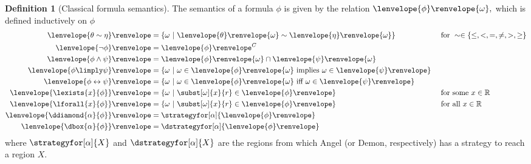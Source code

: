 \documentclass[12pt]{cmuthesis}
\theoremstyle{definition}
\newtheorem{definition}{Definition}
\theoremstyle{remark}
\newcommand{\lequiv}{\leftrightarrow}
\newcommand{\om}{\omega}
\newcommand{\tint}[2]{\lenvelope{#1}\renvelope{#2}}
\newcommand{\fint}[1]{\lenvelope{#1}\renvelope}
\begin{document}
\begin{definition}[Classical formula semantics]\label{def:dgl-sem-fml}
The semantics of a formula $\phi$ is given by the relation $\fint{\phi}{\om},$ which is defined inductively on $\phi$
\begin{align*}
\fint{\theta \sim \eta}  &= \{\om~|~\tint{\theta}{\om} \sim \tint{\eta}{\om}\} && \text{ for }\sim \in \{\leq,<,=,\neq,>,\geq\}\\
\fint{\neg \phi}         &= \fint{\phi}^C && \\
\fint{\phi \land \psi}   &= \fint{\phi}{\om} \cap \fint{\psi}{\om}\\
\fint{\phi \limply \psi} &= \{\om~|~ \om \in \fint{\phi}{\om} \text{ implies } \om \in \fint{\psi}\}\\
\fint{\phi \lequiv \psi} &= \{\om~|~ \om \in \fint{\phi}{\om} \text{ iff } \om \in \fint{\psi}\}\\
\fint{\lexists{x}{\phi}} &= \{\om~|~ \subst[\om]{x}{r} \in \fint{\phi}\} && \text{ for some }x \in \mathbb{R}\\
\fint{\lforall{x}{\phi}} &= \{\om~|~ \subst[\om]{x}{r} \in \fint{\phi}\} && \text{ for all }x \in \mathbb{R}\\
\fint{\ddiamond{\alpha}{\phi}} &=  \strategyfor[\alpha]{\fint{\phi}}\\
\fint{\dbox{\alpha}{\phi}} &= \dstrategyfor[\alpha]{\fint{\phi}}
\end{align*}
where $\strategyfor[\alpha]{X}$ and $\dstrategyfor[\alpha]{X}$ are the regions from which Angel (or Demon, respectively) has a strategy to reach a region $X$.
\end{definition}
\end{document}
